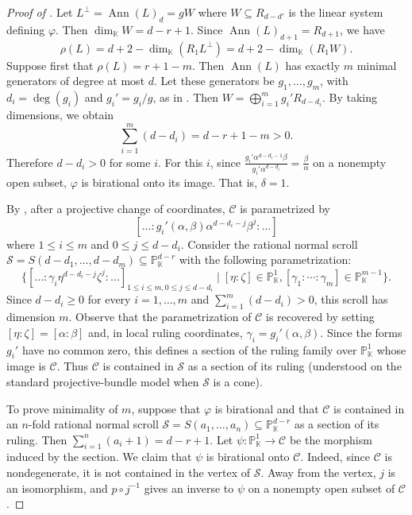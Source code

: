 \documentclass[a4paper, 11pt]{amsart}
\numberwithin{theorem}{section}
\theoremstyle{definition}
\numberwithin{equation}{section}
\DeclareMathOperator{\Ann}{\operatorname{Ann}}
\begin{document}
\begin{proof}[Proof of ]
Let $L^\perp=\Ann(L)_d=gW$ where $W\subseteq R_{d-d'}$ is the linear system defining $\varphi$.
Then $\dim_{\mathbb{K}}W = d-r+1$.
Since $\Ann(L)_{d+1}=R_{d+1}$, 
we have 
\[
\rho(L)=d+2-\dim_{\mathbb{K}}(R_1L^\perp)=d+2-\dim_{\mathbb{K}}(R_1W).
\]
Suppose first that $\rho(L)=r+1-m$.
Then $\Ann(L)$ has exactly $m$ minimal generators of degree at most $d$.
Let these generators be $g_1,\dots,g_m$, with $d_i=\deg(g_i)$ and $g_i'=g_i/g$, as in .
Then $W=\bigoplus_{i=1}^m g_i'R_{d-d_i}$.
By taking dimensions, we obtain 
\[
\sum_{i=1}^m(d-d_i)=d-r+1-m>0.
\]
Therefore $d-d_i>0$ for some $i$.
For this $i$, since $\frac{g_i'\alpha^{d-d_i-1}\beta}{g_i'\alpha^{d-d_i}}=\frac{\beta}{\alpha}$ on a nonempty open subset, $\varphi$ is birational onto its image.
That is, $\delta = 1$.

By , after a projective change of coordinates, $\mathcal{C}$ is parametrized by \[[\dots:g_i'(\alpha,\beta)\alpha^{d-d_i-j}\beta^j:\dots]\] where $1\leq i\leq m$ and $0\leq j\leq d-d_i$.
Consider the rational normal scroll $\mathcal S=S(d-d_1,\dots,d-d_m)\subseteq\mathbb{P}_{\mathbb{K}}^{d-r}$ with the following parametrization:
\begin{equation}
\{[\dots:\gamma_i\eta^{d-d_i-j}\zeta^j:\dots]_{1\le i \le m, 0\le j \le d-d_i}\mid [\eta:\zeta]\in \mathbb{P}_{\mathbb{K}}^1, [\gamma_1:\cdots:\gamma_m]\in\mathbb{P}_{\mathbb{K}}^{m-1}\}.
\end{equation}
Since $d-d_i\geq 0$ for every $i = 1,\dots,m$ and $\sum_{i=1}^m (d-d_i) >0$, this scroll has dimension $m$.
Observe that the parametrization of $\mathcal{C}$ is recovered by setting $[\eta:\zeta]=[\alpha:\beta]$ and, in local ruling coordinates, $\gamma_i=g_i'(\alpha,\beta)$.
Since the forms $g_i'$ have no common zero, this defines a section of the ruling family over $\mathbb{P}_{\mathbb{K}}^1$ whose image is $\mathcal{C}$.
Thus $\mathcal{C}$ is contained in $\mathcal S$ as a section of its ruling (understood on the standard projective-bundle model when $\mathcal S$ is a cone).

To prove minimality of $m$, suppose that $\varphi$ is birational and that $\mathcal{C}$ is contained in an $n$-fold rational normal scroll $\mathcal S=S(a_1,\dots,a_n) \subseteq \mathbb{P}_{\mathbb{K}}^{d-r}$ as a section of its ruling.
Then $\sum_{i=1}^n(a_i+1)=d-r+1$.
Let $\psi:\mathbb P^1_{\mathbb K}\to\mathcal{C}$ be the morphism
induced by the section.
We claim that $\psi$ is birational onto $\mathcal{C}$.
Indeed, since $\mathcal{C}$ is nondegenerate, it is not contained in the vertex of $\mathcal{S}$.
Away from the vertex, $j$ is an isomorphism, and $p\circ j^{-1}$
gives an inverse to $\psi$ on a nonempty open subset of $\mathcal{C}$.


\end{proof}
\end{document}
